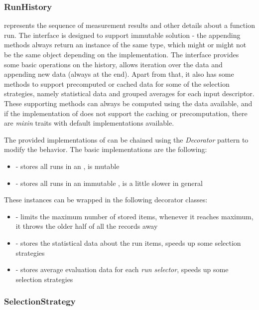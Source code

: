 \subsubsection{RunHistory}

 represents the sequence of measurement results and other details about a function run. The interface is designed to support immutable solution - the appending methods always return an instance of the same type, which might or might not be the same object depending on the implementation. The interface provides some basic operations on the history, allows iteration over the data and appending new data (always at the end). Apart from that, it also has some methods to support precomputed or cached data for some of the selection strategies, namely statistical data and grouped averages for each input descriptor. These supporting methods can always be computed using the data available, and if the implementation of  does not support the caching or precomputation, there are \textit{mixin} traits with default implementations available.

The provided implementations of  can be chained using the \textit{Decorator} pattern to modify the behavior. The basic implementations are the following:
\begin{itemize}
	\item {} - stores all runs in an , is mutable
	\item {} - stores all runs in an immutable , is a little slower in general
\end{itemize}

These instances can be wrapped in the following decorator classes:
\begin{itemize}
	\item {} - limits the maximum number of stored items, whenever it reaches maximum, it throws the older half of all the records away
	\item {} - stores the statistical data about the run items, speeds up some selection strategies
	\item {} - stores average evaluation data for each \textit{run selector}, speeds up some selection strategies
\end{itemize}

\subsubsection{SelectionStrategy}

